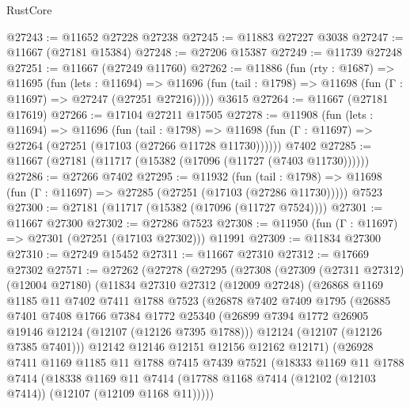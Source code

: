 \begin{lexlean}{RustCore}
\begin{coremodule}
@27243 := @11652 @27228 @27238
@27245 := @11883 @27227 @3038
@27247 := @11667 (@27181 @15384)
@27248 := @27206 @15387
@27249 := @11739 @27248
@27251 := @11667 (@27249 @11760)
@27262 := @11886
    (fun (rty : @1687) =>
    @11695
      (fun (lets : @11694) =>
      @11696 (fun (tail : @1798) => @11698 (fun (Γ : @11697) => @27247 (@27251 @27216)))))
    @3615
@27264 := @11667 (@27181 @17619)
@27266 := @17104 @27211 @17505
@27278 := @11908
    (fun (lets : @11694) =>
    @11696
      (fun (tail : @1798) =>
      @11698 (fun (Γ : @11697) => @27264 (@27251 (@17103 (@27266 @11728 @11730))))))
    @7402
@27285 := @11667 (@27181 (@11717 (@15382 (@17096 (@11727 (@7403 @11730))))))
@27286 := @27266 @7402
@27295 := @11932
    (fun (tail : @1798) => @11698 (fun (Γ : @11697) => @27285 (@27251 (@17103 (@27286 @11730)))))
    @7523
@27300 := @27181 (@11717 (@15382 (@17096 (@11727 @7524))))
@27301 := @11667 @27300
@27302 := @27286 @7523
@27308 := @11950 (fun (Γ : @11697) => @27301 (@27251 (@17103 @27302))) @11991
@27309 := @11834 @27300
@27310 := @27249 @15452
@27311 := @11667 @27310
@27312 := @17669 @27302
@27571 := @27262
    (@27278
      (@27295
        (@27308
          (@27309
            (@27311 @27312)
            (@12004 @27180)
            (@11834
              @27310
              @27312
              (@12009 @27248)
              (@26868
                @1169
                @1185
                @11
                @7402
                @7411
                @1788
                @7523
                (@26878
                  @7402
                  @7409
                  @1795
                  (@26885
                    @7401
                    @7408
                    @1766
                    @7384
                    @1772
                    @25340
                    (@26899 @7394 @1772 @26905 @19146 @12124 (@12107 (@12126 @7395 @1788)))
                    @12124
                    (@12107 (@12126 @7385 @7401)))
                  @12142
                  @12146
                  @12151
                  @12156
                  @12162
                  @12171)
                (@26928
                  @7411
                  @1169
                  @1185
                  @11
                  @1788
                  @7415
                  @7439
                  @7521
                  (@18333
                    @1169
                    @11
                    @1788
                    @7414
                    (@18338
                      @1169
                      @11
                      @7414
                      (@17788 @1168 @7414 (@12102 (@12103 @7414)) (@12107 (@12109 @1168 @11)))))

\end{coremodule}
\end{lexlean}
